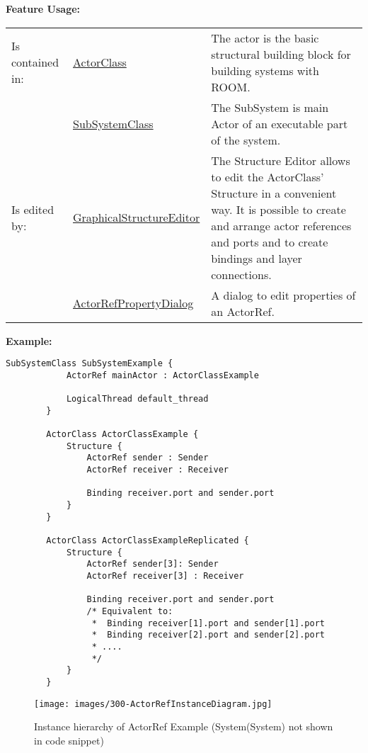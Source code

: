 	\begingroup
	\textbf{Feature Usage:}
	\renewcommand{\arraystretch}{1.8} %
	\begin{longtable}{l|l p{}}
		\hline
	Is contained in: & \tabitem \hyperlink{ref:ActorClass}{ActorClass}  & The actor is the basic structural building block for building systems with ROOM.\\
	& \tabitem \hyperlink{ref:SubSystemClass}{SubSystemClass}  & The SubSystem is main Actor of an executable part of the system.  \\
	\hline
	Is edited by: & \tabitem \hyperlink{ref:GraphicalStructureEditor}{GraphicalStructureEditor}  & The Structure Editor allows to edit the ActorClass' Structure in a convenient way. It is possible to create and arrange actor references and ports and to create bindings and layer connections.\\
	& \tabitem \hyperlink{ref:ActorRefPropertyDialog}{ActorRefPropertyDialog}  & A dialog to edit properties of an ActorRef. \\
	\hline
	\end{longtable}
	\endgroup
		
	\textbf{Example:}
	
		\begin{lstlisting}[language=ROOM]
		SubSystemClass SubSystemExample {
			ActorRef mainActor : ActorClassExample
			
			LogicalThread default_thread
		}
		
		ActorClass ActorClassExample {
			Structure {
				ActorRef sender : Sender
				ActorRef receiver : Receiver
				
				Binding receiver.port and sender.port
			}
		}
		
		ActorClass ActorClassExampleReplicated {
			Structure {
				ActorRef sender[3]: Sender
				ActorRef receiver[3] : Receiver
				
				Binding receiver.port and sender.port
				/* Equivalent to:
				 *  Binding receiver[1].port and sender[1].port
				 *  Binding receiver[2].port and sender[2].port
				 * ....
				 */		
			}
		}
		\end{lstlisting}
		\begin{figure}[H]
		\texttt{[image: images/300-ActorRefInstanceDiagram.jpg]}
		\caption*{Instance hierarchy of ActorRef Example (\textsf{System(System)} not shown in code snippet)}
		\end{figure}
	
	\vspace{\baselineskip}
	\vspace{\baselineskip}
	\vspace{\baselineskip}
	
